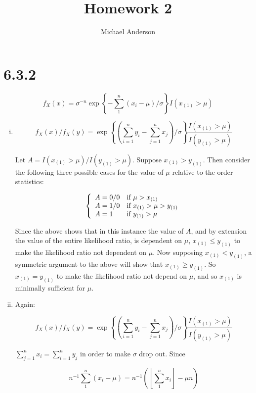 \documentclass{article}
\author{Michael Anderson}
\title{Homework 2}
\begin{document}
\setlength{\parskip}{1em}
\maketitle
{}
\flushleft
\newpage

\section{6.3.2}

\[
f_X(x) = \sigma^{-n} \exp \left\{-\sum_1^n (x_i-\mu)/\sigma \right\}
I(x_{(1)}>\mu)
\]

\begin{enumerate}[(i)]

\item
\[
f_X(x)/f_X(y) = \exp \left\{ \left( \sum_{i=1}^n y_i - \sum_{j=1}^n x_j \right)
/\sigma \right\}
\frac{I(x_{(1)}>\mu)}{I(y_{(1)}>\mu)}
\]

Let $A = I(x_{(1)}>\mu)/I(y_{(1)}>\mu)$. Suppose $x_{(1)} > y_{(1)}$.
Then consider the following three possible cases for the value of $\mu$
relative to the order statistics:

\[
\left\{ \begin{array}{l l}
A = 0/0 & \text{if } \mu > x_{(1)} \\
A = 1/0 & \text{if } x_{(1)} > \mu > y_{(1)} \\
A = 1 & \text{if } y_{(1)} > \mu \\
\end{array} \right.
\]

Since the above shows that in this instance the value of $A$,
and by extension the value of the entire likelihood
ratio, is dependent on $\mu$, $x_{(1)} \le y_{(1)}$ to make the likelihood
ratio not dependent on $\mu$. Now supposing $x_{(1)} < y_{(1)}$, a symmetric
argument to the above will show
that $x_{(1)} \ge y_{(1)}$. So $x_{(1)} = y_{(1)}$ to make the likelihood
ratio not depend on $\mu$, and so $x_{(1)}$ is minimally sufficient for
$\mu$. 

\item

Again:

\[
f_X(x)/f_X(y) = \exp \left\{ \left( \sum_{i=1}^n y_i - \sum_{j=1}^n x_j \right)
/\sigma \right\}
\frac{I(x_{(1)}>\mu)}{I(y_{(1)}>\mu)}
\]

$\sum_{j=1}^n x_i = \sum_{i=1}^n y_j$ in order to make $\sigma$ drop out.
Since

\[
n^{-1} \sum_1^n (x_i-\mu) = n^{-1} 
\left( \left[\sum_1^n x_i\right] - \mu n \right)
\]


\end{enumerate}
\end{document}

